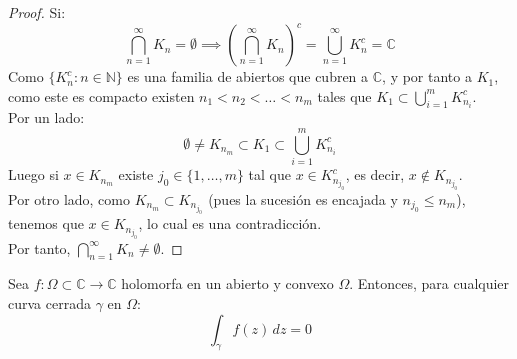 \begin{proof}
    Si:
    \[
    \bigcap_{n=1}^{\infty} K_n = \emptyset \implies
    \left( \bigcap_{n=1}^{\infty} K_n \right)^c =
    \bigcup_{n=1}^{\infty} K_n^c = \mathbb{C}
    \]
    Como $\{ K_n^c : n \in \mathbb{N} \}$ es una familia de abiertos que cubren a $\mathbb{C}$, y por tanto a $K_1$, como este es compacto existen $n_1 < n_2 < \ldots < n_m$ tales que $K_1 \subset \bigcup_{i=1}^{m} K_{n_i}^c$.\\
    Por un lado:
    \[
    \emptyset \neq K_{n_m} \subset K_1 \subset \bigcup_{i=1}^{m} K_{n_i}^c
    \]
    Luego si $x \in K_{n_m}$ existe $j_0 \in \{1, \ldots, m\}$ tal que $x \in K_{n_{j_0}}^c$, es decir, $x \notin K_{n_{j_0}}$.\\
    Por otro lado, como $K_{n_m} \subset K_{n_{j_0}}$ (pues la sucesión es encajada y $n_{j_0} \leq n_m$), tenemos que $x \in K_{n_{j_0}}$, lo cual es una contradicción.\\
    Por tanto, $\bigcap_{n=1}^{\infty} K_n \neq \emptyset$.
\end{proof}

\begin{teorema}
    Sea $f: \Omega \subset \mathbb{C} \to \mathbb{C}$ holomorfa en un abierto y convexo $\Omega$. Entonces, para cualquier curva cerrada $\gamma$ en $\Omega$:
    \[
        \int_{\gamma} f(z) \, dz = 0
    \]
\end{teorema}

